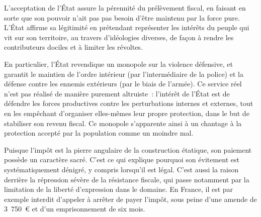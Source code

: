 L'acceptation de l'État assure la pérennité du prélèvement fiscal, en faisant en sorte que son pouvoir n'ait pas pas besoin d'être maintenu par la force pure. L'État affirme sa légitimité en prétendant représenter les intérêts du peuple qui vit sur son territoire, au travers d'idéologies diverses, de façon à rendre les contributeurs dociles et à limiter les révoltes.

En particulier, l'État revendique un monopole sur la violence défensive, et garantit le maintien de l'ordre intérieur (par l'intermédiaire de la police) et la défense contre les ennemis extérieurs (par le biais de l'armée). Ce service réel n'est pas réalisé de manière purement altruiste~: l'intérêt de l'État est de défendre les forces productives contre les perturbations internes et externes, tout en les empêchant d'organiser elles-mêmes leur propre protection, dans le but de stabiliser son revenu fiscal. Ce monopole s'apparente ainsi à un chantage à la protection accepté par la population comme un moindre mal.

Puisque l'impôt est la pierre angulaire de la construction étatique, son paiement possède un caractère sacré. C'est ce qui explique pourquoi son évitement est systématiquement dénigré, y compris lorsqu'il est légal. C'est aussi la raison derrière la répression sévère de la résistance fiscale, qui passe notamment par la limitation de la liberté d'expression dans le domaine. En France, il est par exemple interdit d'appeler à arrêter de payer l'impôt, sous peine d'une amende de 3~750~\euro{} et d'un emprisonnement de six mois. %

